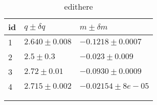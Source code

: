 \begin{longtable}{@{}lll@{}}
\toprule
id & $q \pm \delta q$ & $m \pm \delta m$ \tabularnewline
\midrule
1 & $2.640 \pm 0.008$ & $-0.1218 \pm 0.0007$ \tabularnewline
2 & $2.5 \pm 0.3$ & $-0.023 \pm 0.009$ \tabularnewline
3 & $2.72 \pm 0.01$ & $-0.0930 \pm 0.0009$ \tabularnewline
4 & $2.715 \pm 0.002$ & $-0.02154 \pm 8e-05$ \tabularnewline
\bottomrule
\label{tab:edithere}
\\
\caption{edithere}
\end{longtable}
